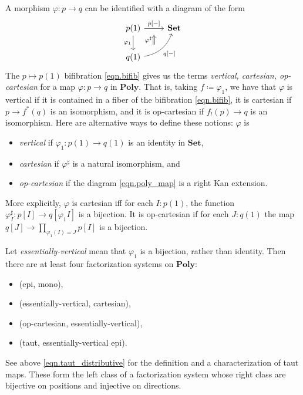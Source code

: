 \documentclass[11pt, one side, article]{memoir}
\theoremstyle{definition}
\theoremstyle{plain}
\newcommand{\Cat}[1]{\mathbf{#1}}%
\newcommand{\smset}{\Cat{Set}}
\newcommand{\poly}{\Cat{Poly}}
\newcommand{\0}{\textsf{0}}
\newcommand{\1}{\tn{\textsf{1}}}
\begin{document}
A morphism $\varphi\colon p\to q$ can be identified with a diagram of the form
\begin{equation}\label{eqn.poly_map}
\begin{tikzcd}
	p(1)\ar[d, "\varphi_1"']\ar[r, "{p[-]}", ""' name=p]&
	\smset\\
	q(1)\ar[ur, bend right, "{q[-]}"', "" name=q]
	\ar[to=p, from=q-|p, Rightarrow, shorten=3pt, "\varphi^\sharp"]
\end{tikzcd}
\end{equation}
The $p\mapsto p(1)$ bifibration \eqref{eqn.bifib} gives us the terms \emph{vertical, cartesian,  op-cartesian} for a map $\varphi\colon p\to q$ in $\poly$. That is, taking $f\coloneqq\varphi_1$, we have that $\varphi$ is vertical if it is contained in a fiber of the bifibration \eqref{eqn.bifib}, it is cartesian if $p\to f^*(q)$ is an isomorphism, and it is op-cartesian if $f_!(p)\to q$ is an isomorphism. Here are alternative ways to define these notions: $\varphi$ is 
\begin{itemize}
	\item \emph{vertical} if $\varphi_1\colon p(1)\to q(1)$ is an identity in $\smset$,
	\item \emph{cartesian} if $\varphi^\sharp$ is a natural isomorphism, and
	\item \emph{op-cartesian} if the diagram \eqref{eqn.poly_map} is a right Kan extension.
\end{itemize}
More explicitly, $\varphi$ is cartesian iff for each $I: p(1)$, the function $\varphi^\sharp_I\colon p[I]\to q[\varphi_1I]$ is a bijection. It is op-cartesian if for each $J: q(1)$ the map $q[J]\to\prod\limits_{\varphi_1(I)=J}p[I]$ is a bijection.

Let \emph{essentially-vertical} mean that $\varphi_1$ is a bijection, rather than identity. Then there are at least four factorization systems on $\poly$:
\begin{itemize}
	\item (epi, mono),
	\item (essentially-vertical, cartesian),
	\item (op-cartesian, essentially-vertical),
	\item (taut, essentially-vertical epi).
\end{itemize}
See above \eqref{eqn.taut_distributive} for the definition and a characterization of taut maps. These form the left class of a factorization system whose right class are bijective on positions and injective on directions.
\end{document}
